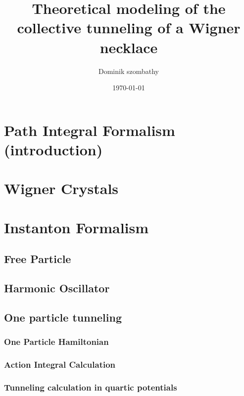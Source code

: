 

\title{Theoretical modeling of the collective tunneling of a Wigner necklace\\}
\author{Dominik szombathy}
\date{\today}



\maketitle

\begin{abstract}

\end{abstract}

\tableofcontents

\pagestyle{plain}


\section{Path Integral Formalism (introduction)}

\section{Wigner Crystals}

\section{Instanton Formalism}
	\subsection{Free Particle}
	\subsection{Harmonic Oscillator}
	\subsection{One particle tunneling}
		\subsubsection{One Particle Hamiltonian}
		\subsubsection{Action Integral Calculation}
		\subsubsection{Tunneling calculation in quartic potentials}


